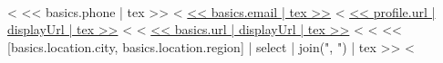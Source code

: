\begin{center}
  \textbf{\Huge \color{maincolor}{<< basics.name | tex >>}} \\ \vspace{1pt}
  \small
<%
  \faMobile\space << basics.phone | tex >> \textbar{}
<%
  \href{mailto:<< basics.email | url >>}{\faEnvelope\space << basics.email | tex >>}
<%
  \textbar{} \href{<< profile.url | url >>}{<< profile.url | displayUrl | tex >>}
<%
<%
  \textbar{} \href{<< basics.url | url >>}{<< basics.url | displayUrl | tex >>}
<%
<%
  \textbar{} \faMapMarker\space << [basics.location.city, basics.location.region] | select | join(", ") | tex >>
<%
\end{center}

